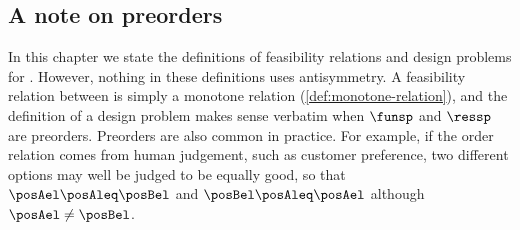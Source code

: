 %
%
%



\subsection{A note on preorders}
\label{sec:dp-note-on-preorders}

In this chapter we state the definitions of feasibility relations and design problems for .
However, nothing in these definitions uses antisymmetry.
A feasibility relation between  is simply a monotone relation (\cref{def:monotone-relation}), and the definition of a design problem makes sense verbatim when $\funsp$ and $\ressp$ are preorders.
Preorders are also common in practice.
For example, if the order relation comes from human judgement, such as customer preference, two different options may well be judged to be equally good, so that $\posAel \posAleq \posBel$ and $\posBel \posAleq \posAel$ although $\posAel \neq \posBel$.


